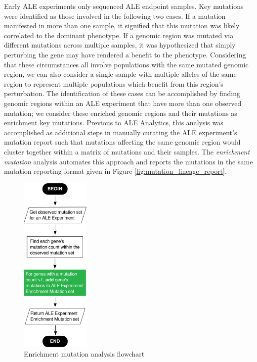 \documentclass[12pt,final,masters,chapterheads]{ucsd}  %
\begin{document}
Early ALE experiments only sequenced ALE endpoint samples. Key mutations were identified as those involved in the following two cases. If a mutation manifested in more than one sample, it signified that this mutation was likely correlated to the dominant phenotype. If a genomic region was mutated via different mutations across multiple samples, it was hypothesized that simply perturbing the gene may have rendered a benefit to the phenotype. Considering that these circumstances all involve populations with the same mutated genomic region, we can also consider a single sample with multiple alleles of the same region to represent multiple populations which benefit from this region's perturbation. The identification of these cases can be accomplished by finding genomic regions within an ALE experiment that have more than one observed mutation; we consider these enriched genomic regions and their mutations as enrichment key mutations. Previous to ALE Analytics, this analysis was accomplished as additional steps in manually curating the ALE experiment's mutation report such that mutations affecting the same genomic region would cluster together within a matrix of mutations and their samples. The \textit{enrichment mutation} analysis automates this approach and reports the mutations in the same mutation reporting format given in Figure \ref{fig:mutation_lineage_report}.

\begin{figure}[H]
  \centering
  \includegraphics[width=0.3\textwidth]{enrichment_mutation_flowchart.png}
  \caption{Enrichment mutation analysis flowchart}
\end{figure}
\end{document}
